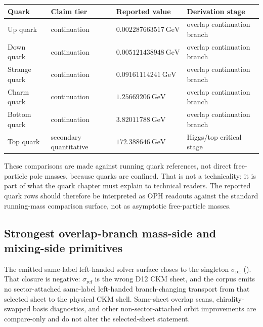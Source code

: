 \documentclass[11pt]{article}
\newcommand{\ophid}[1]{\path{#1}}
\begin{document}
\begin{table}[h]
\centering
\small
\begin{tabular}{@{}llll@{}}
\toprule
Quark & Claim tier & Reported value & Derivation stage \\
\midrule
Up quark & continuation & \(0.002287663517~\mathrm{GeV}\) & overlap continuation branch \\
Down quark & continuation & \(0.005121438948~\mathrm{GeV}\) & overlap continuation branch \\
Strange quark & continuation & \(0.09161114241~\mathrm{GeV}\) & overlap continuation branch \\
Charm quark & continuation & \(1.25669206~\mathrm{GeV}\) & overlap continuation branch \\
Bottom quark & continuation & \(3.82011788~\mathrm{GeV}\) & overlap continuation branch \\
Top quark & secondary quantitative & \(172.388646~\mathrm{GeV}\) & Higgs/top critical stage \\
\bottomrule
\end{tabular}
\end{table}

These comparisons are made against running quark references, not direct free-particle pole
masses, because quarks are confined. That is not a technicality; it is part of what the quark
chapter must explain to technical readers. The reported quark rows should therefore be interpreted
as OPH readouts against the standard running-mass comparison surface, not as
asymptotic free-particle masses.

\subsection{Strongest overlap-branch mass-side and mixing-side primitives}\label{quark-family-strongest-overlap-branch-primitives}

The emitted same-label left-handed solver surface closes to the singleton \(\sigma_{\mathrm{ref}}\) (\ophid{sigma_ref}). That closure is negative: \(\sigma_{\mathrm{ref}}\) is the wrong D12 CKM sheet, and the corpus emits no sector-attached same-label left-handed branch-changing transport from that selected sheet to the physical CKM shell. Same-sheet overlap scans, chirality-swapped basis diagnostics, and other non-sector-attached orbit improvements are compare-only and do not alter the selected-sheet statement.
\end{document}
